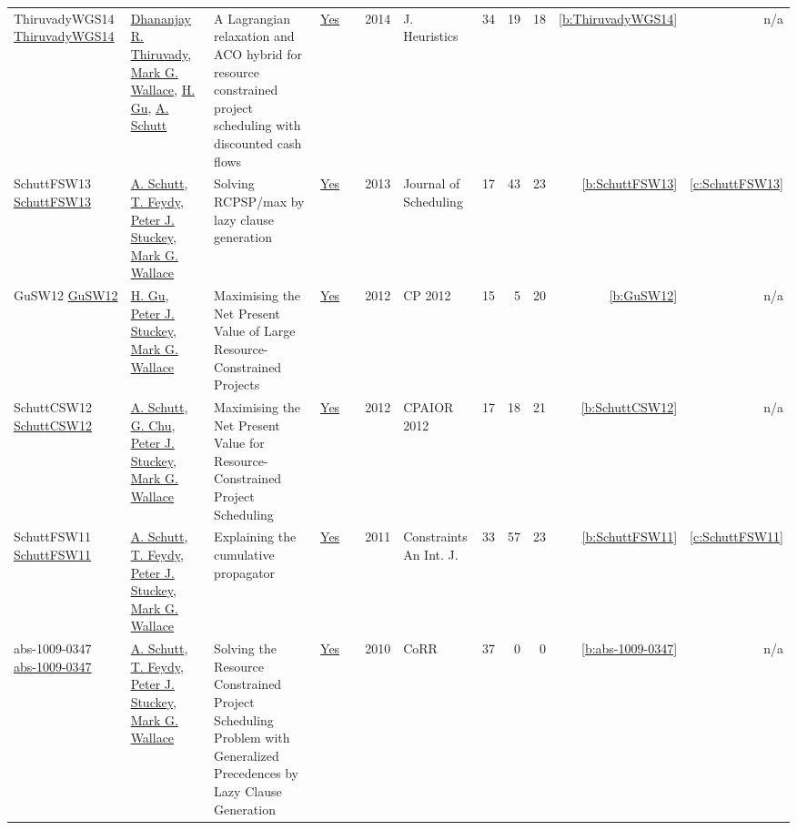{\begin{longtable}{>{\raggedright\arraybackslash}p{3cm}>{\raggedright\arraybackslash}p{6cm}>{\raggedright\arraybackslash}p{6.5cm}rrrp{2.5cm}rrrrr}
ThiruvadyWGS14 \href{https://doi.org/10.1007/s10732-014-9260-3}{ThiruvadyWGS14} & \hyperref[auth:a399]{Dhananjay R. Thiruvady}, \hyperref[auth:a117]{Mark G. Wallace}, \hyperref[auth:a339]{H. Gu}, \hyperref[auth:a125]{A. Schutt} & A Lagrangian relaxation and {ACO} hybrid for resource constrained project scheduling with discounted cash flows & \href{../works/ThiruvadyWGS14.pdf}{Yes} & \cite{ThiruvadyWGS14} & 2014 & J. Heuristics & 34 & 19 & 18 & \ref{b:ThiruvadyWGS14} & n/a\\
SchuttFSW13 \href{https://doi.org/10.1007/s10951-012-0285-x}{SchuttFSW13} & \hyperref[auth:a125]{A. Schutt}, \hyperref[auth:a155]{T. Feydy}, \hyperref[auth:a126]{Peter J. Stuckey}, \hyperref[auth:a117]{Mark G. Wallace} & Solving RCPSP/max by lazy clause generation & \href{../works/SchuttFSW13.pdf}{Yes} & \cite{SchuttFSW13} & 2013 & Journal of Scheduling & 17 & 43 & 23 & \ref{b:SchuttFSW13} & \ref{c:SchuttFSW13}\\
GuSW12 \href{https://doi.org/10.1007/978-3-642-33558-7_55}{GuSW12} & \hyperref[auth:a339]{H. Gu}, \hyperref[auth:a126]{Peter J. Stuckey}, \hyperref[auth:a117]{Mark G. Wallace} & Maximising the Net Present Value of Large Resource-Constrained Projects & \href{../works/GuSW12.pdf}{Yes} & \cite{GuSW12} & 2012 & CP 2012 & 15 & 5 & 20 & \ref{b:GuSW12} & n/a\\
SchuttCSW12 \href{https://doi.org/10.1007/978-3-642-29828-8_24}{SchuttCSW12} & \hyperref[auth:a125]{A. Schutt}, \hyperref[auth:a346]{G. Chu}, \hyperref[auth:a126]{Peter J. Stuckey}, \hyperref[auth:a117]{Mark G. Wallace} & Maximising the Net Present Value for Resource-Constrained Project Scheduling & \href{../works/SchuttCSW12.pdf}{Yes} & \cite{SchuttCSW12} & 2012 & CPAIOR 2012 & 17 & 18 & 21 & \ref{b:SchuttCSW12} & n/a\\
SchuttFSW11 \href{https://doi.org/10.1007/s10601-010-9103-2}{SchuttFSW11} & \hyperref[auth:a125]{A. Schutt}, \hyperref[auth:a155]{T. Feydy}, \hyperref[auth:a126]{Peter J. Stuckey}, \hyperref[auth:a117]{Mark G. Wallace} & Explaining the cumulative propagator & \href{../works/SchuttFSW11.pdf}{Yes} & \cite{SchuttFSW11} & 2011 & Constraints An Int. J. & 33 & 57 & 23 & \ref{b:SchuttFSW11} & \ref{c:SchuttFSW11}\\
abs-1009-0347 \href{http://arxiv.org/abs/1009.0347}{abs-1009-0347} & \hyperref[auth:a125]{A. Schutt}, \hyperref[auth:a155]{T. Feydy}, \hyperref[auth:a126]{Peter J. Stuckey}, \hyperref[auth:a117]{Mark G. Wallace} & Solving the Resource Constrained Project Scheduling Problem with Generalized Precedences by Lazy Clause Generation & \href{../works/abs-1009-0347.pdf}{Yes} & \cite{abs-1009-0347} & 2010 & CoRR & 37 & 0 & 0 & \ref{b:abs-1009-0347} & n/a\\

\end{longtable}}

